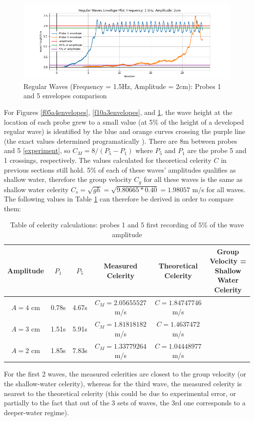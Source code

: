 \documentclass{article}
\begin{document}
	\vspace{-.5cm}
	\begin{figure}[H]
		\centering
		\includegraphics[clip, trim = {1cm 0.1cm 1cm 0.5cm},width=\textwidth]{../graphs/F15A2Probes1and5Envelope.png}
		\caption{Regular Waves (Frequency = 1.5Hz, Amplitude = 2cm): Probes 1 and 5 envelopes comparison}
		\label{f15a2envelopes}
	\end{figure}
	For Figures \ref{f05a4envelopes}, \ref{f10a3envelopes}, and \ref{f15a2envelopes}, the wave height at the location of each probe grew to a small value (at 5\% of the height of a developed regular wave) is identified by the blue and orange curves crossing the purple line (the exact values determined programatically \cite{code}). There are 8m between probes and 5 \ref{experiment}, so $C_M = 8/(P_5 - P_1)$ where $P_5$ and $P_1$ are the probe 5 and 1 crossings, respectively. The values calculated for theoretical celerity $C$ in previous sections still hold. 
	5\% of each of these waves' amplitudes qualifies as shallow water, therefore the group velocity $C_g$ for all these waves is  the same as shallow water celerity $C_s = \sqrt{gh} = \sqrt{9.80665 * 0.40} = 1.98057$ m/s for all waves.\\
	The following values in Table \ref{smallwavefronttable} can therefore be derived in order to compare them:\\
	\begin{table}[H]
		\centering
		\begin{tabular}{|c|c|c|c|c|c|}
			\hline
			Amplitude & \textbf{$P_1$} & \textbf{$P_5$} & \textbf{Measured Celerity} & Theoretical Celerity & Group Velocity  = Shallow Water Celerity\\ \hline
			$A = 4$ cm & 0.78s & 4.67s & $C_M = 2.05655527$ m/s & $C = 1.84747746$ m/s & {\multirow{3}{*}{$C_g = C_s = 1.98057$ m/s}}\\ \cline{1-5}
			$A = 3$ cm & 1.51s & 5.91s & $C_M = 1.81818182$ m/s & $C = 1.4637472$ m/s & {} \\ \cline{1-5}
			$A = 2$ cm & 1.85s & 7.83s & $C_M = 1.33779264$ m/s & $C = 1.04448977$ m/s & {} \\ \hline
		\end{tabular}
	\caption{Table of celerity calculations: probes 1 and 5 first recording of 5\% of the wave amplitude}
	\label{smallwavefronttable}
	\end{table}
	For the first 2 waves, the measured celerities are closest to the group velocity (or the shallow-water celerity), whereas for the third wave, the measured celerity is nearest to the theoretical celerity (this could be due to experimental error, or partially to the fact that out of the 3 sets of waves, the 3rd one corresponds to a deeper-water regime).
\end{document}
